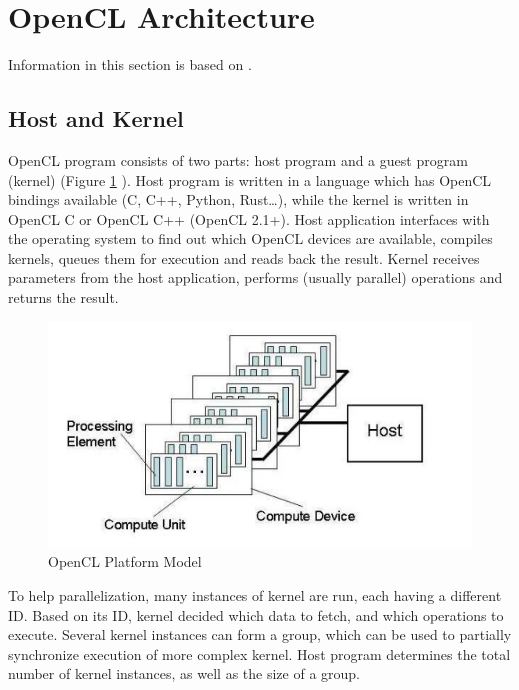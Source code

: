 
\section{OpenCL Architecture}

Information in this section is based on \cite{gaster2012heterogeneous}.

\subsection{Host and Kernel}

OpenCL program consists of two parts: host program and a guest program (kernel) (Figure \ref{fig:openclplatform} \cite{munshi2009opencl}). Host program is written in a language which has OpenCL bindings available (C, C++, Python, Rust\dots), while the kernel is written in OpenCL C or OpenCL C++ (OpenCL 2.1+). Host application interfaces with the operating system to find out which OpenCL devices are available, compiles kernels, queues them for execution and reads back the result. Kernel receives parameters from the host application, performs (usually parallel) operations and returns the result.

\begin{figure}[h]
    \includegraphics[width=\linewidth]{Figures/platform.png}
    \caption{OpenCL Platform Model}
    \label{fig:openclplatform}
\end{figure}

To help parallelization, many instances of kernel are run, each having a different ID. Based on its ID, kernel decided which data to fetch, and which operations to execute. Several kernel instances can form a group, which can be used to partially synchronize execution of more complex kernel. Host program determines the total number of kernel instances, as well as the size of a group.

